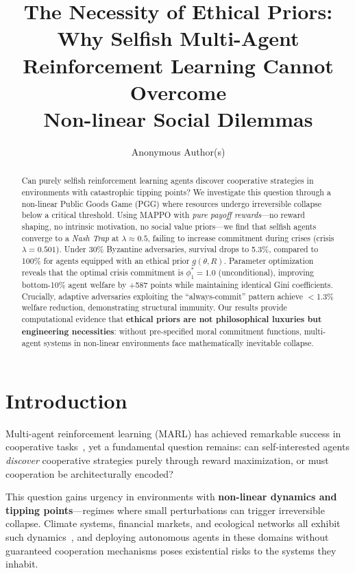 \documentclass{article}
\title{The Necessity of Ethical Priors:\\Why Selfish Multi-Agent Reinforcement Learning Cannot Overcome\\Non-linear Social Dilemmas}
\author{
  Anonymous Author(s)
}
\begin{document}
\maketitle

\begin{abstract}
Can purely selfish reinforcement learning agents discover cooperative strategies in environments with catastrophic tipping points?
We investigate this question through a non-linear Public Goods Game (PGG) where resources undergo irreversible collapse below a critical threshold.
Using MAPPO with \emph{pure payoff rewards}---no reward shaping, no intrinsic motivation, no social value priors---we find that selfish agents converge to a \emph{Nash Trap} at $\lambda \approx 0.5$, failing to increase commitment during crises (crisis $\lambda = 0.501$).
Under 30\% Byzantine adversaries, survival drops to 5.3\%, compared to 100\% for agents equipped with an ethical prior $g(\theta, R)$.
Parameter optimization reveals that the optimal crisis commitment is $\phi_1^* = 1.0$ (unconditional), improving bottom-10\% agent welfare by +587 points while maintaining identical Gini coefficients.
Crucially, adaptive adversaries exploiting the ``always-commit'' pattern achieve $<$1.3\% welfare reduction, demonstrating structural immunity.
Our results provide computational evidence that \textbf{ethical priors are not philosophical luxuries but engineering necessities}: without pre-specified moral commitment functions, multi-agent systems in non-linear environments face mathematically inevitable collapse.
\end{abstract}

\section{Introduction}

Multi-agent reinforcement learning (MARL) has achieved remarkable success in cooperative tasks~\cite{yu2022surprising}, yet a fundamental question remains: can self-interested agents \emph{discover} cooperative strategies purely through reward maximization, or must cooperation be architecturally encoded?

This question gains urgency in environments with \textbf{non-linear dynamics and tipping points}---regimes where small perturbations can trigger irreversible collapse.
Climate systems, financial markets, and ecological networks all exhibit such dynamics~\cite{lenton2008tipping}, and deploying autonomous agents in these domains without guaranteed cooperation mechanisms poses existential risks to the systems they inhabit.
\end{document}
